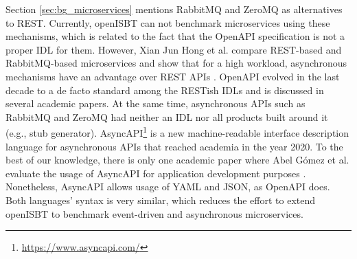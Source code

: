 
Section \ref{sec:bg_microservices} mentions RabbitMQ and ZeroMQ as alternatives to REST. Currently, openISBT can not benchmark microservices using these mechanisms, which is related to the fact that the OpenAPI specification is not a proper IDL for them. However, Xian Jun Hong et al. compare REST-based and RabbitMQ-based microservices and show that for a high workload, asynchronous mechanisms have an advantage over REST APIs \cite{relWork:comparing_RabbitMQ_and_REST}.
OpenAPI evolved in the last decade to a de facto standard among the RESTish IDLs and is discussed in several academic papers. At the same time, asynchronous APIs such as RabbitMQ and ZeroMQ had neither an IDL nor all products built around it (e.g., stub generator). 
AsyncAPI\footnote{\url{https://www.asyncapi.com/}} is a new machine-readable interface description language for asynchronous APIs that reached academia in the year 2020. To the best of our knowledge, there is only one academic paper where Abel G\'omez et al. evaluate the usage of AsyncAPI for application development purposes \cite{relWork:AyncAPI}. Nonetheless, AsyncAPI allows usage of YAML and JSON, as OpenAPI does. Both languages' syntax is very similar, which reduces the effort to extend openISBT to benchmark event-driven and asynchronous microservices.